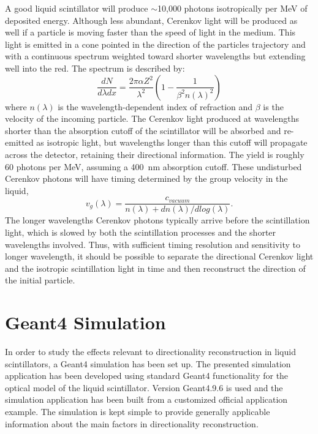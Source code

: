 \documentclass[aps,prc,twocolumn,groupedaddress,showpacs,amsmath,amssymb,floatfix,superscriptaddress]{revtex4}
\begin{document}
A good liquid scintillator will produce $\sim$10,000 photons
isotropically per MeV of deposited energy. Although less abundant,
Cerenkov light will be produced as well if a particle is moving faster
than the speed of light in the medium.  This light is emitted in a
cone pointed in the direction of the particles trajectory and with a
continuous spectrum weighted toward shorter wavelengths
but extending well into the red. The spectrum is described by:
\begin{equation}
\label{eqCerenkov}
\frac{dN}{d\lambda dx} = \frac{2 \pi \alpha Z^2}{\lambda^2} ( 1 - \frac{1}{\beta^2 n(\lambda)^2} )
\end{equation}
where $n(\lambda)$ is the wavelength-dependent index of refraction and
$\beta$ is the velocity of the incoming particle. The Cerenkov light
produced at wavelengths shorter than the absorption cutoff of the
scintillator will be absorbed and re-emitted as isotropic light, but
wavelengths longer than this cutoff will propagate across the
detector, retaining their directional information. The yield is
roughly 60 photons per MeV, assuming a 400~nm absorption
cutoff\cite{qdot}. These undisturbed Cerenkov photons will have timing
determined by the group velocity in the liquid,
\begin{equation}
\label{eqGroup}
v_{g}(\lambda) = \frac{c_{vacuum}}{n(\lambda) + dn(\lambda)/dlog(\lambda)}.
\end{equation}
The longer wavelengths Cerenkov photons typically arrive before
the scintillation light, which is slowed by both the scintillation
processes and the shorter wavelengths involved. Thus, with sufficient
timing resolution and sensitivity to longer wavelength, it should be
possible to separate the directional Cerenkov light and the isotropic
scintillation light in time and then reconstruct the direction of the
initial particle.

\section{Geant4 Simulation}
In order to study the effects relevant to directionality reconstruction in liquid scintillators, a Geant4 \cite{geant4one,geant4two} simulation has been set up. The presented simulation application has been developed using standard Geant4 functionality for the optical model of the liquid scintillator. Version Geant4.9.6 is used and the simulation application has been built from a customized official application example. The simulation is kept simple to provide generally applicable information about the main factors in directionality reconstruction. 
\end{document}
